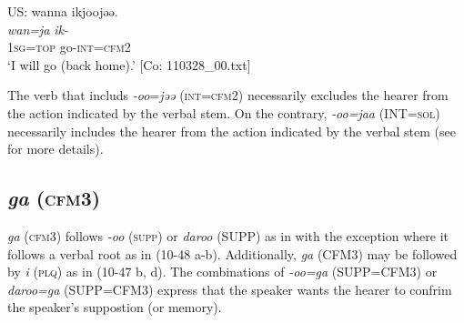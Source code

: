   \ex  US: 
      \glll wanna  ikjoojəə.\\
      \textit{wan=ja}  \textit{ik-}\\
      1\textsc{sg}=\textsc{top}  go-\textsc{int}=\textsc{cfm}2\\
      \glt       ‘I will go (back home).’ [Co: 110328\_00.txt]
    \z
\z

The verb that includs \textit{{}-oo}=\textit{jəə} (\textsc{int}=\textsc{cfm}2) necessarily excludes the hearer from the action indicated by the verbal stem. On the contrary, \textit{{}-oo=jaa} (INT=\textsc{sol}) necessarily includes the hearer from the action indicated by the verbal stem (see  for more details).

\subsection{\textit{ga} (\textsc{cfm}3)}\label{sec:10.3.5}

\textit{ga} (\textsc{cfm}3) follows \textit{{}-oo} (\textsc{supp}) or \textit{daroo} (SUPP) as in  with the exception where it follows a verbal root as in (10-48 a-b). Additionally, \textit{ga} (CFM3) may be followed by \textit{i} (\textsc{plq}) as in (10-47 b, d). The combinations of \textit{{}-oo=ga} (SUPP=CFM3) or \textit{daroo=ga} (SUPP=CFM3) express that the speaker wants the hearer to confrim the speaker’s suppostion (or memory).

